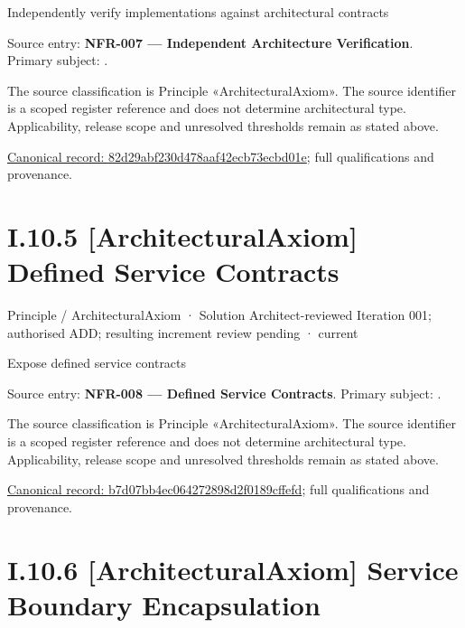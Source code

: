 Independently verify implementations against architectural contracts



Source entry: \textbf{NFR-007 — Independent Architecture Verification}. Primary subject: \texttt{}.



The source classification is Principle «ArchitecturalAxiom». The source identifier is a scoped register reference and does not determine architectural type. Applicability, release scope and unresolved thresholds remain as stated above.


{\footnotesize \href{../../../../../../../../continuum/motivation/principle/architectural-axiom/82d29abf230d478aaf42ecb73ecbd01e.md}{Canonical record: 82d29abf230d478aaf42ecb73ecbd01e}; full qualifications and provenance.}\par
\section*{I.10.5 [ArchitecturalAxiom] Defined Service Contracts}
\label{navigation:I.10.5}

\label{element:b7d07bb4ec064272898d2f0189cffefd}
{\small Principle / ArchitecturalAxiom · Solution Architect-reviewed Iteration 001; authorised ADD; resulting increment review pending · current}\par

Expose defined service contracts



Source entry: \textbf{NFR-008 — Defined Service Contracts}. Primary subject: \texttt{}.



The source classification is Principle «ArchitecturalAxiom». The source identifier is a scoped register reference and does not determine architectural type. Applicability, release scope and unresolved thresholds remain as stated above.


{\footnotesize \href{../../../../../../../../continuum/motivation/principle/architectural-axiom/b7d07bb4ec064272898d2f0189cffefd.md}{Canonical record: b7d07bb4ec064272898d2f0189cffefd}; full qualifications and provenance.}\par
\section*{I.10.6 [ArchitecturalAxiom] Service Boundary Encapsulation}
\label{navigation:I.10.6}

